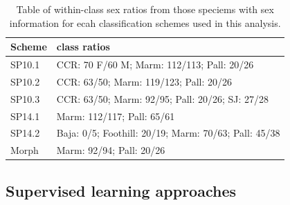 \documentclass[10pt,letterpaper]{article}
\begin{document}
\begin{table}
  \centering
  \caption{Table of within-class sex ratios from those speciems with sex information for ecah classification schemes used in this analysis.}
    \begin{tabular}{l l}
      \hline
      Scheme & class ratios \\
      \hline
      SP10.1 & CCR: 70 F/60 M; Marm: 112/113; Pall: 20/26 \\
      SP10.2 &  CCR: 63/50; Marm: 119/123; Pall: 20/26 \\
      SP10.3 & CCR: 63/50; Marm: 92/95; Pall: 20/26; SJ: 27/28 \\
      SP14.1 & Marm: 112/117; Pall: 65/61 \\
      SP14.2 & Baja: 0/5; Foothill: 20/19; Marm: 70/63; Pall: 45/38\\
      Morph & Marm: 92/94; Pall: 20/26 \\
      \hline
    \end{tabular}
  \label{tab:sex_ratio}
\end{table}



\subsection*{Supervised learning approaches}

\begin{table}
  \centering
  \caption{Table of the supervised learning methods used in this analysis.}
  \label{tab:methods}
\end{table}
\end{document}
